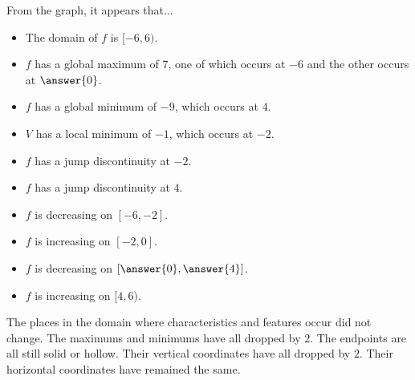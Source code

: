 \documentclass{ximera}
\begin{document}
\begin{example}
\begin{image}
\end{image}





From the graph, it appears that... 

\begin{itemize}

\item The domain of $f$ is $[-6,6)$.
\item $f$ has a global maximum of $7$, one of which occurs at $-6$ and the other occurs at $\answer{0}$.
\item $f$ has a global minimum of $-9$, which occurs at $4$.
\item $V$ has a local minimum of $-1$, which occurs at $-2$.
\item $f$ has a jump discontinuity at $-2$.
\item $f$ has a jump discontinuity at $4$.
\item $f$ is decreasing on $[-6, -2]$.
\item $f$ is increasing on $[-2, 0]$.
\item $f$ is decreasing on $\left[\answer{0}, \answer{4}\right]$.
\item $f$ is increasing on $[4, 6)$.


\end{itemize}



The places in the domain where characteristics and features occur did not change.  The maximums and minimums have all dropped by $2$.  The endpoints are all still solid or hollow.  Their vertical coordinates have all dropped by $2$. Their horizontal coordinates have remained the same.






\end{example}
\end{document}
